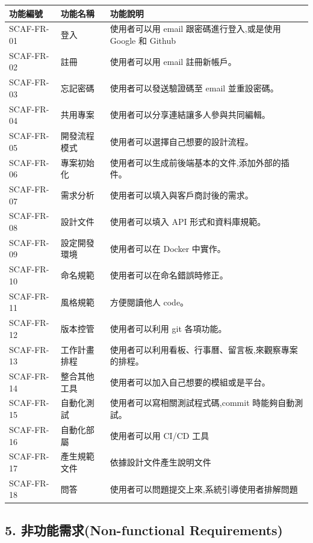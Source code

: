 \documentclass{report}
\begin{document}
\begin{tabularx}{\textwidth}{
  |p{}%
  |p{}%
  |p{}|%
}
  \hline
  功能編號 & 功能名稱 & 功能說明 \\ \hline
  SCAF-FR-01 & 登入 & 使用者可以用 email 跟密碼進行登入,或是使用 Google 和 Github \\ \hline
  SCAF-FR-02 & 註冊 & 使用者可以用 email 註冊新帳戶。 \\ \hline
  SCAF-FR-03 & 忘記密碼 & 使用者可以發送驗證碼至 email 並重設密碼。 \\ \hline
  SCAF-FR-04 & 共用專案 & 使用者可以分享連結讓多人參與共同編輯。 \\ \hline
  SCAF-FR-05 & 開發流程模式 & 使用者可以選擇自己想要的設計流程。 \\ \hline
  SCAF-FR-06 & 專案初始化 & 使用者可以生成前後端基本的文件,添加外部的插件。 \\ \hline
  SCAF-FR-07 & 需求分析 & 使用者可以填入與客戶商討後的需求。 \\ \hline
  SCAF-FR-08 & 設計文件 & 使用者可以填入 API 形式和資料庫規範。 \\ \hline
  SCAF-FR-09 & 設定開發環境 & 使用者可以在 Docker 中實作。 \\ \hline
  SCAF-FR-10 & 命名規範 & 使用者可以在命名錯誤時修正。 \\ \hline
  SCAF-FR-11 & 風格規範 & 方便閱讀他人 code。 \\ \hline
  SCAF-FR-12 & 版本控管 & 使用者可以利用 git 各項功能。 \\ \hline
  SCAF-FR-13 & 工作計畫排程 & 使用者可以利用看板、行事曆、留言板,來觀察專案的排程。 \\ \hline
  SCAF-FR-14 & 整合其他工具 & 使用者可以加入自己想要的模組或是平台。 \\ \hline
  SCAF-FR-15 & 自動化測試 & 使用者可以寫相關測試程式碼,commit 時能夠自動測試。 \\ \hline
  SCAF-FR-16 & 自動化部屬 & 使用者可以用 CI/CD 工具 \\ \hline
  SCAF-FR-17 & 產生規範文件 & 依據設計文件產生說明文件 \\ \hline
  SCAF-FR-18 & 問答 & 使用者可以問題提交上來,系統引導使用者排解問題 \\ \hline
\end{tabularx}

\subsection*{5. 非功能需求(Non-functional Requirements)}
\end{document}
